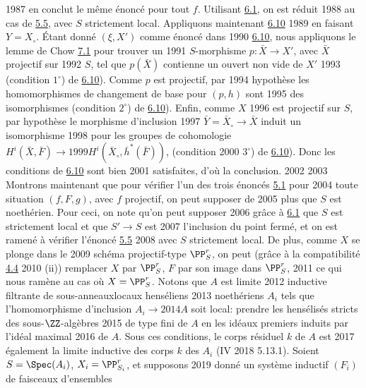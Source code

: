   1987	en conclut le même énoncé pour tout $f$. Utilisant \hyperref[XII.lem6.1]{6.1}, on est réduit
  1988	au cas de \hyperref[XII.cor5.5]{5.5}, avec $S$ strictement local. Appliquons maintenant \hyperref[XII.cor6.10]{6.10}
  1989	en faisant $Y=X_{\circ}$. Étant donné $(\xi, X')$ comme énoncé dans
  1990	\hyperref[XII.cor6.10]{6.10}, nous appliquons le lemme de Chow \hyperref[XII.lem7.1]{7.1} pour trouver un
  1991	$S$-morphisme $p:\bar{X}\rightarrow X'$, avec $\bar{X}$ projectif sur
  1992	$S$, tel que $p(\bar{X})$ contienne un ouvert non vide de $X'$
  1993	(condition $1^{\circ}$) de \hyperref[XII.cor6.10]{6.10}). Comme $p$ est projectif, par
  1994	hypothèse les homomorphismes de changement de base pour $(p,h)$ sont
  1995	des isomorphismes (condition $2^{\circ}$) de \hyperref[XII.cor6.10]{6.10}). Enfin, comme $X$
  1996	est projectif sur $S$, par hypothèse le morphisme d'inclusion
  1997	$\bar{Y}=\bar{X}_{\circ}\rightarrow \bar{X}$ induit un isomorphisme
  1998	pour les groupes de cohomologie $H^{i}(\bar{X},\bar{F})\rightarrow
  1999	H^{i}(\bar{X}_{\circ},\bar{h}^{\ast}(\bar{F}))$, (condition
  2000	$3^{\circ}$) de \hyperref[XII.cor6.10]{6.10}). Donc les conditions de \hyperref[XII.cor6.10]{6.10} sont bien
  2001	satisfaites, d'où la conclusion.
  2002	
  2003	Montrons maintenant que pour vérifier l'un des trois énoncés \hyperref[XII.thm5.1]{5.1} pour
  2004	toute situation $(f,F,g)$, avec $f$ projectif, on peut supposer de
  2005	plus que $S$ est noethérien. Pour ceci, on note qu'on peut supposer
  2006	grâce à \hyperref[XII.lem6.1]{6.1} que $S$ est strictement local et que $S'\rightarrow S$ est
  2007	l'inclusion du point fermé, et on est ramené à vérifier l'énoncé \hyperref[XII.cor5.5]{5.5}
  2008	avec $S$ strictement local. De plus, comme $X$ se plonge dans le
  2009	schéma projectif-type $\PP^r_S$, on peut (grâce à la compatibilité \hyperref[XII.prop4.4]{4.4}
  2010	(ii)) remplacer $X$ par $\PP^r_S$, $F$ par son image dans $\PP^r_S$,
  2011	ce qui nous ramène au cas où $X=\PP^r_S$. Notons que $A$ est limite
  2012	inductive filtrante de sous-anneaux\pageoriginale locaux henséliens
  2013	noethériens $A_i$ tels que l'homomorphisme d'inclusion $A_i\rightarrow
  2014	A$ soit local: prendre les hensélisés stricts des sous-$\ZZ$-algèbres
  2015	de type fini de $A$ en les idéaux premiers induits par l'idéal maximal
  2016	de $A$. Sous ces conditions, le corps résiduel $k$ de $A$ est
  2017	également la limite inductive des corps $k$ des $A_i$ (\EGA IV
  2018	5.13.1). Soient $S=\Spec (A_i)$, $X_i=\PP^r_{S_i}$, et supposons
  2019	donné un système inductif $(F_i)$ de faisceaux d'ensembles
